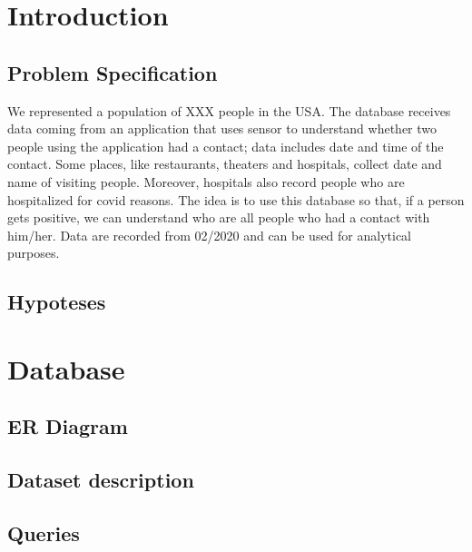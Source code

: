 \documentclass[12pt, a4paper]{article}
\begin{document}
\clearpage

\tableofcontents

\listoftodos

\clearpage

\section{Introduction}

\subsection{Problem Specification}

We represented a population of XXX  people in the USA.  
The database receives data coming from an application that uses sensor to understand whether two people using the application had a contact; data includes date and time of the contact.  
Some places, like restaurants, theaters and hospitals, collect date and name of visiting people. Moreover, hospitals also record people who are hospitalized for covid reasons. 
The idea is to use this database so that, if a person gets positive, we can understand who are all people who had a contact with him/her. Data are recorded from 02/2020 and can be used for analytical purposes. 

\subsection{Hypoteses}

\blindtext

\clearpage

\section{Database}

\subsection{ER Diagram}

\blindtext

\subsection{Dataset description}

\blindtext

\subsection{Queries}
\end{document}
